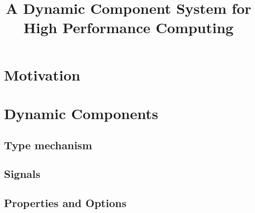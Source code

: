 \documentclass[12pt]{scrartcl}
\title{A Dynamic Component System for High Performance Computing}
\author{}
\begin{document}
\maketitle

\tableofcontents


\section{Motivation} 



\section{Dynamic Components} 


\subsection{Type mechanism}





\subsection{Signals}





\subsection{Properties and Options}


\end{document}
